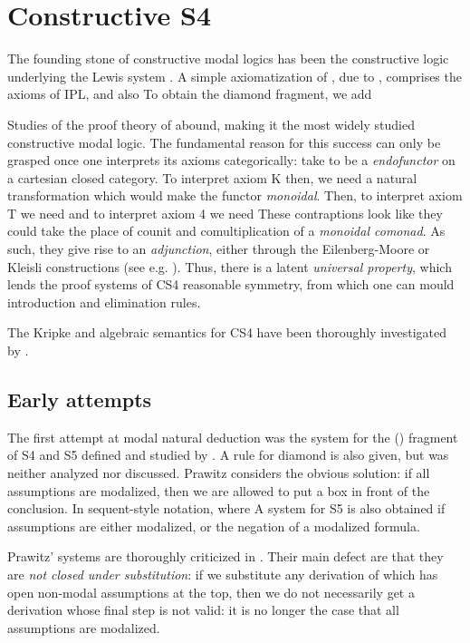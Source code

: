\documentclass[a4paper]{amsart}
\begin{document}
\section{Constructive S4}
  \label{sec:cs4}

The founding stone of constructive modal logics has been the
constructive logic underlying the Lewis system 
\citep{Lewis1932}. A simple axiomatization of , due
to \cite{Alechina2001}, comprises the axioms of \textsf{IPL}, and
also  To obtain the diamond fragment, we add 

Studies of the proof theory of  abound, making it
the most widely studied constructive modal logic. The fundamental
reason for this success can only be grasped once one interprets
its axioms categorically: take  to be a \emph{endofunctor}
on a cartesian closed category. To interpret axiom \textsf{K}
then, we need a natural transformation  which would make the functor \emph{monoidal}. Then, to
interpret axiom \textsf{T} we need  and to interpret axiom \textsf{4} we need  These contraptions look like they could take the place of
counit and comultiplication of a \emph{monoidal comonad}. As such,
they give rise to an \emph{adjunction}, either through the
Eilenberg-Moore or Kleisli constructions (see e.g.
\cite{Awodey2010}).  Thus, there is a latent \emph{universal
property}, which lends the proof systems of \textsf{CS4}
reasonable symmetry, from which one can mould introduction and
elimination rules.

The Kripke and algebraic semantics for \textsf{CS4} have been
thoroughly investigated by \cite{Alechina2001}.

\subsection{Early attempts}

The first attempt at modal natural deduction was the system for
the () fragment of \textsf{S4} and \textsf{S5} defined and
studied by \cite{Prawitz1965}. A rule for diamond is also given,
but was neither analyzed nor discussed. Prawitz considers
the obvious solution: if all assumptions are modalized, then we
are allowed to put a box in front of the conclusion. In
sequent-style notation,  where  A system for \textsf{S5} is also obtained if assumptions are
either modalized, or the negation of a modalized formula.

Prawitz' systems are thoroughly criticized in \citep{Bierman2000a}.
Their main defect are that they are \emph{not closed under
substitution}: if we substitute any derivation of  which
has open non-modal assumptions at the top, then we do not
necessarily get a derivation whose final step is not valid: it
is no longer the case that all assumptions are modalized. 
\end{document}
